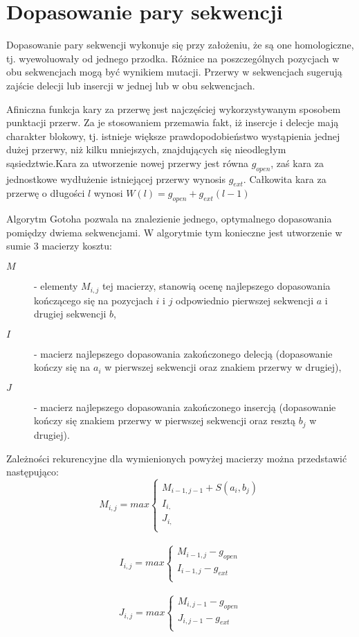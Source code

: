 \documentclass[a4paper,10pt]{article}
\begin{document}
	\section{Dopasowanie pary sekwencji}

	Dopasowanie pary sekwencji wykonuje się przy założeniu, że są one homologiczne, tj. wyewoluowały od jednego przodka. Różnice na poszczególnych pozycjach w obu sekwencjach mogą być wynikiem mutacji. Przerwy w sekwencjach sugerują zajście delecji lub insercji w jednej lub w obu sekwencjach.

	Afiniczna funkcja kary za przerwę jest najczęściej wykorzystywanym sposobem punktacji przerw. Za je stosowaniem przemawia fakt, iż insercje i delecje mają charakter blokowy, tj. istnieje większe prawdopodobieństwo wystąpienia jednej dużej przerwy, niż kilku mniejszych, znajdujących się nieodległym sąsiedztwie.Kara za utworzenie nowej przerwy jest równa $g_{open}$, zaś kara za jednostkowe wydłużenie istniejącej przerwy wynosis $g_{ext}$. Całkowita kara za przerwę o długości $l$ wynosi \mbox{$W(l) = g_{open} + g_{ext}(l - 1)$}

	Algorytm Gotoha pozwala na znalezienie jednego, optymalnego dopasowania  pomiędzy dwiema sekwencjami. W algorytmie tym konieczne jest utworzenie w sumie 3 macierzy kosztu:
	\begin{description}
	\item[$M$]
	 - elementy $M_{i,j}$ tej macierzy, stanowią ocenę najlepszego dopasowania kończącego się na pozycjach $i$ i $j$ odpowiednio pierwszej sekwencji $a$ i drugiej sekwencji $b$,
	\item[$I$]
	 - macierz najlepszego dopasowania zakończonego delecją (dopasowanie kończy się na $a_i$ w pierwszej sekwencji oraz znakiem przerwy w drugiej),
	\item[$J$]
	 - macierz najlepszego dopasowania zakończonego insercją (dopasowanie kończy się znakiem przerwy w pierwszej sekwencji oraz resztą $b_j$ w drugiej).
	\end{description}
	Zależności rekurencyjne dla wymienionych powyżej macierzy można przedstawić następująco:
	\[
		M_{i,j} = max \left\{
			\begin{array}{ll}
				M_{i-1, j-1} + S(a_i, b_j)\\
				I_{i, }\\
				J_{i, }\\
			\end{array} \right.
	\]\\
	\[
		I_{i,j} = max \left\{
			\begin{array}{ll}
				M_{i-1, j} - g_{open}\\
				I_{i-1, j} - g_{ext}\\
			\end{array} \right.
	\]\\
	\[
		J_{i,j} = max \left\{
			\begin{array}{ll}
				M_{i, j-1} - g_{open}\\
				J_{i, j-1} - g_{ext}\\
			\end{array} \right.
	\]
\end{document}
